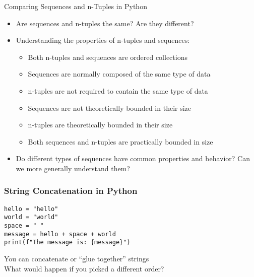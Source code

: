 \documentclass[14pt,aspectratio=169]{beamer}
\begin{document}
%
\begin{frame}{Comparing Sequences and n-Tuples in Python}
  \begin{itemize}
    \item Are sequences and n-tuples the same? Are they different?
      \vspace*{-.15in}
    \item Understanding the properties of n-tuples and sequences:
      \begin{itemize}
        \item Both n-tuples and sequences are ordered collections
        \item Sequences are normally composed of the same type of data
        \item n-tuples are not required to contain the same type of data
        \item Sequences are not theoretically bounded in their size
        \item n-tuples are theoretically bounded in their size
        \item Both sequences and n-tuples are practically bounded in size
      \end{itemize}
      \vspace*{-.2in}
    \item Do different types of sequences have common properties and behavior?
      Can we more generally understand them?
  \end{itemize}
\end{frame}

%
\begin{frame}[fragile]
  \frametitle{String Concatenation in Python}
  \begin{minipage}{6in}
    \vspace*{.25in}
    \begin{verbatim}
hello = "hello"
world = "world"
space = " "
message = hello + space + world
print(f"The message is: {message}")
    \end{verbatim}
  \end{minipage}
  \vspace*{.05in}
  \begin{center}
    \normalsize \noindent You can concatenate or ``glue together'' strings \\
    \normalsize \noindent What would happen if you picked a different order?\\
  \end{center}
\end{frame}
\end{document}
